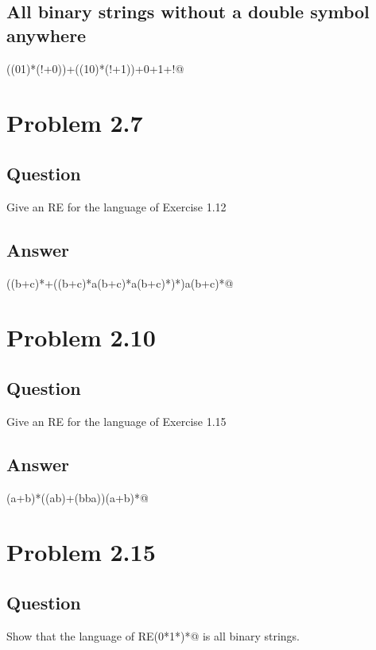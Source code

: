 \documentclass[12pt, a4paper]{article}
\begin{document}
\subsection{All binary strings without a double symbol anywhere}
\begin{center}
\verb@((01)*(!+0))+((10)*(!+1))+0+1+!@
\end{center}

\section{Problem 2.7}
\subsection{Question}
Give an RE for the language of Exercise 1.12
\subsection{Answer}
\begin{center}
\verb@((b+c)*+((b+c)*a(b+c)*a(b+c)*)*)a(b+c)*@
\end{center}

\section{Problem 2.10}
\subsection{Question}
Give an RE for the language of Exercise 1.15
\subsection{Answer}
\begin{center}
\verb@(a+b)*((ab)+(bba))(a+b)*@
\end{center} 	

\section{Problem 2.15}
\subsection{Question}
Show that the language of RE\verb@(0*1*)*@ is all binary strings.
\end{document}
